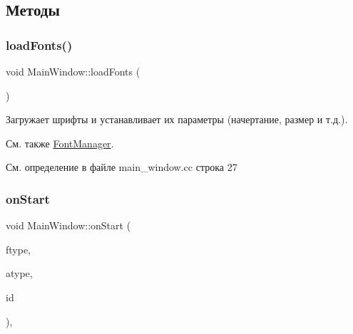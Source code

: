 \subsection{Методы}
\hypertarget{class_main_window_af0898886d5a3e9c0b336312e959daae6}{}\label{class_main_window_af0898886d5a3e9c0b336312e959daae6} 
\subsubsection{\texorpdfstring{load\+Fonts()}{loadFonts()}}
{\footnotesize\ttfamily void Main\+Window\+::load\+Fonts (\begin{DoxyParamCaption}{ }\end{DoxyParamCaption})\hspace{0.3cm}{\ttfamily [private]}}



Загружает шрифты и устанавливает их параметры (начертание, размер и т.\+д.). 

\begin{DoxySeeAlso}{См. также}
\hyperlink{class_font_manager}{Font\+Manager}. 
\end{DoxySeeAlso}


См. определение в файле main\+\_\+window.\+cc строка 27

\hypertarget{class_main_window_a16686da6ed1d113106f9dc24694db2b9}{}\label{class_main_window_a16686da6ed1d113106f9dc24694db2b9} 
\subsubsection{\texorpdfstring{on\+Start}{onStart}}
{\footnotesize\ttfamily void Main\+Window\+::on\+Start (\begin{DoxyParamCaption}\item[{\hyperlink{namespace_core_af88278693f3c866f217da796f4bb9af7}{Core\+::\+F\+I\+L\+T\+E\+R\+\_\+\+T\+Y\+PE}}]{ftype,  }\item[{\hyperlink{namespace_core_acd67f53ff1d9b21fabb1da4474a8f7d9}{Core\+::\+A\+P\+P\+R\+O\+X\+\_\+\+T\+Y\+PE}}]{atype,  }\item[{\hyperlink{namespace_filters_a1b615faac44ef992d0af44da40ff26d7}{Filters\+::\+F\+I\+L\+T\+E\+R\+\_\+\+ID}}]{id }\end{DoxyParamCaption})\hspace{0.3cm}{\ttfamily [private]}, {\ttfamily [slot]}}



